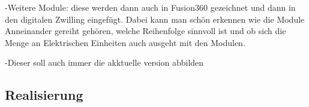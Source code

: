     -Weitere Module: diese werden dann auch in Fusion360 gezeichnet und dann in den digitalen Zwilling eingefügt. Dabei kann man schön erkennen wie die Module Anneinander gereiht gehören, welche Reihenfolge sinnvoll ist und ob sich die Menge an Elektrischen Einheiten auch ausgeht mit den Modulen. 

    -Dieser soll auch immer die akktuelle version abbilden


\subsection{Realisierung}
\label{sec:Schaltplan}



